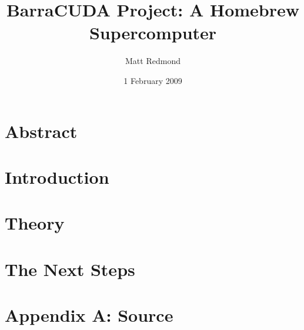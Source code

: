 \documentclass[10pt]{article}
\title{BarraCUDA Project: A Homebrew Supercomputer}  %
\author{Matt Redmond}      %
\date{1 February 2009}
\begin{document}
\maketitle
\tableofcontents
\clearpage

\section{Abstract}

\section{Introduction} %

\section{Theory}

\section{The Next Steps}

\appendix
\section{Appendix A: Source}
\end{document}
